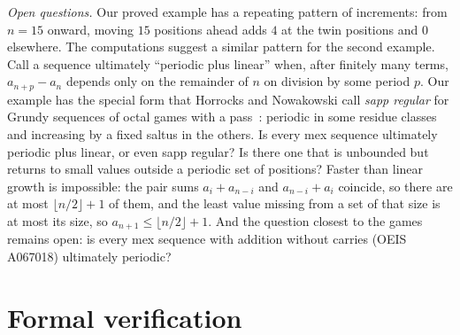 \documentclass[11pt]{amsart}
\theoremstyle{remark}
\begin{document}
\emph{Open questions.} Our proved example has a repeating pattern of increments: from $n=15$ onward, moving $15$ positions ahead adds $4$ at the twin positions and $0$ elsewhere. The computations suggest a similar pattern for the second example. Call a sequence ultimately ``periodic plus linear'' when, after finitely many terms, $a_{n+p}-a_n$ depends only on the remainder of $n$ on division by some period $p$. Our example has the special form that Horrocks and Nowakowski call \emph{sapp regular} for Grundy sequences of octal games with a pass~\cite{HN}: periodic in some residue classes and increasing by a fixed saltus in the others. Is every mex sequence ultimately periodic plus linear, or even sapp regular? Is there one that is unbounded but returns to small values outside a periodic set of positions? Faster than linear growth is impossible: the pair sums $a_i+a_{n-i}$ and $a_{n-i}+a_i$ coincide, so there are at most $\lfloor n/2\rfloor+1$ of them, and the least value missing from a set of that size is at most its size, so $a_{n+1}\le\lfloor n/2\rfloor+1$. And the question closest to the games remains open: is every mex sequence with addition without carries (OEIS A067018) ultimately periodic?

\section{Formal verification}\label{sec:lean}
\end{document}
